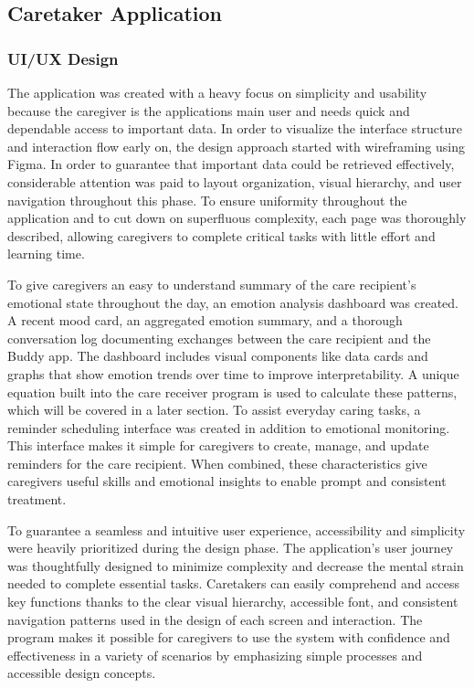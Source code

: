 \subsection{Caretaker Application}
\subsubsection{UI/UX Design}
{ 
	\setlength{\leftskip}{1.8cm}
	\setlength{\parindent}{5em}
	The application was created with a heavy focus on simplicity and usability because the caregiver is the applications main user and needs quick and dependable access to important data. In order to visualize the interface structure and interaction flow early on, the design approach started with wireframing using Figma. In order to guarantee that important data could be retrieved effectively, considerable attention was paid to layout organization, visual hierarchy, and user navigation throughout this phase. To ensure uniformity throughout the application and to cut down on superfluous complexity, each page was thoroughly described, allowing caregivers to complete critical tasks with little effort and learning time.
	\par
}

{ 
	\setlength{\leftskip}{1.8cm}
	\setlength{\parindent}{5em}
	To give caregivers an easy to understand summary of the care recipient's emotional state throughout the day, an emotion analysis dashboard was created. A recent mood card, an aggregated emotion summary, and a thorough conversation log documenting exchanges between the care recipient and the Buddy app. The dashboard includes visual components like data cards and graphs that show emotion trends over time to improve interpretability. A unique equation built into the care receiver program is used to calculate these patterns, which will be covered in a later section. To assist everyday caring tasks, a reminder scheduling interface was created in addition to emotional monitoring. This interface makes it simple for caregivers to create, manage, and update reminders for the care recipient. When combined, these characteristics give caregivers useful skills and emotional insights to enable prompt and consistent treatment.
	\par
}

\newpage
{ 
	\setlength{\leftskip}{1.8cm}
	\setlength{\parindent}{5em}
	To guarantee a seamless and intuitive user experience, accessibility and simplicity were heavily prioritized during the design phase. The application's user journey was thoughtfully designed to minimize complexity and decrease the mental strain needed to complete essential tasks. Caretakers can easily comprehend and access key functions thanks to the clear visual hierarchy, accessible font, and consistent navigation patterns used in the design of each screen and interaction. The program makes it possible for caregivers to use the system with confidence and effectiveness in a variety of scenarios by emphasizing simple processes and accessible design concepts.
	\par
}
